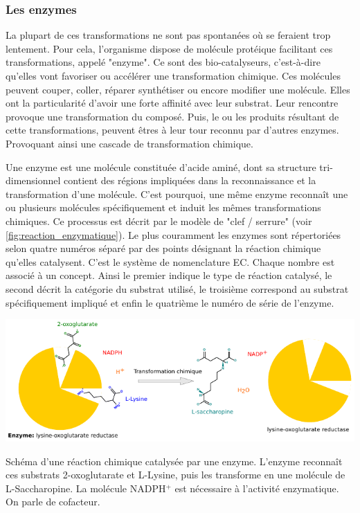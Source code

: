 \begin{refsegment}
    
    \subsubsection{Les enzymes}    
    La plupart de ces transformations ne sont pas spontanées où se feraient trop lentement. Pour cela, l'organisme dispose de molécule protéique facilitant ces transformations, appelé "enzyme". Ce sont des bio-catalyseurs, c'est-à-dire qu'elles vont favoriser ou accélérer une transformation chimique. Ces molécules peuvent couper, coller, réparer synthétiser ou encore modifier une molécule. Elles ont la particularité d'avoir une forte affinité avec leur substrat.  Leur rencontre provoque une transformation du composé. Puis, le ou les produits résultant de cette transformations, peuvent êtres à leur tour reconnu par d'autres enzymes. Provoquant ainsi une cascade de transformation chimique. 
    
    Une enzyme est une molécule constituée d'acide aminé, dont sa structure tri-dimensionnel contient des régions impliquées dans la reconnaissance et la transformation d’une molécule. C'est pourquoi, une même enzyme reconnaît une ou plusieurs molécules spécifiquement et induit les mêmes transformations chimiques. Ce processus est décrit par le modèle de "clef / serrure" (voir \cref{fig:reaction_enzymatique}). Le plus couramment les enzymes sont répertoriées selon quatre numéros séparé par des points désignant la réaction chimique qu'elles catalysent. C'est le système de nomenclature \acrfull{EC}. Chaque nombre est associé à un concept. Ainsi le premier indique le type de réaction catalysé,  le second décrit la catégorie du substrat utilisé, le troisième correspond au substrat spécifiquement impliqué et enfin le quatrième le numéro de série de l'enzyme.
    
    \begin{shadedfigure}[H]
        \centering
        \includegraphics[width=\textwidth]{img/lysine-oxoglutarate_reductase.pdf}
        \caption{Schéma d'une réaction chimique catalysée par une enzyme. L'enzyme reconnaît ces substrats 2-oxoglutarate et L-Lysine, puis les transforme en une molécule de L-Saccharopine. La molécule NADPH$^{+}$ est nécessaire à l'activité enzymatique. On parle de cofacteur.}
        \label{fig:reaction_enzymatique}
    \end{shadedfigure}
    

\end{refsegment}
